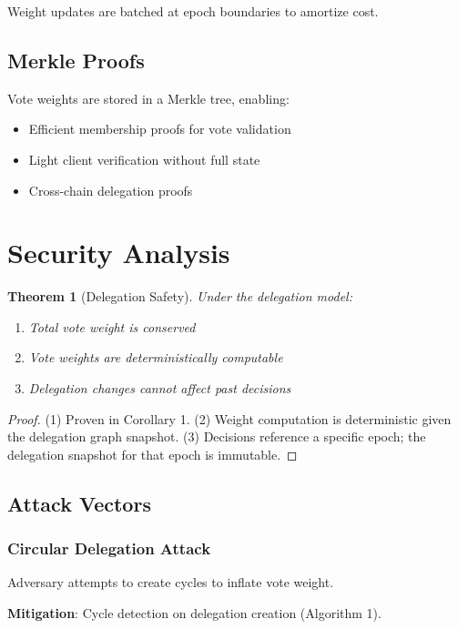 \documentclass[11pt,a4paper]{article}
\newtheorem{theorem}{Theorem}
\begin{document}
Weight updates are batched at epoch boundaries to amortize cost.

\subsection{Merkle Proofs}

Vote weights are stored in a Merkle tree, enabling:
\begin{itemize}
    \item Efficient membership proofs for vote validation
    \item Light client verification without full state
    \item Cross-chain delegation proofs
\end{itemize}

\section{Security Analysis}

\begin{theorem}[Delegation Safety]
Under the delegation model:
\begin{enumerate}
    \item Total vote weight is conserved
    \item Vote weights are deterministically computable
    \item Delegation changes cannot affect past decisions
\end{enumerate}
\end{theorem}

\begin{proof}
(1) Proven in Corollary 1. (2) Weight computation is deterministic given the delegation graph snapshot. (3) Decisions reference a specific epoch; the delegation snapshot for that epoch is immutable.
\end{proof}

\subsection{Attack Vectors}

\subsubsection{Circular Delegation Attack}
Adversary attempts to create cycles to inflate vote weight.

\textbf{Mitigation}: Cycle detection on delegation creation (Algorithm 1).
\end{document}
